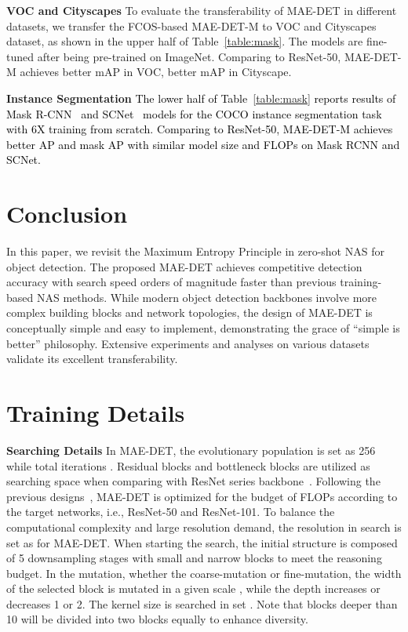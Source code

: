\documentclass[nohyperref]{article}
\theoremstyle{plain}
\theoremstyle{definition}
\theoremstyle{remark}
\begin{document}
\noindent\textbf{VOC and Cityscapes} 
To evaluate the transferability of MAE-DET in different datasets, we transfer the FCOS-based MAE-DET-M to VOC and Cityscapes dataset, as shown in the upper half of Table~\ref{table:mask}. The models are fine-tuned after being pre-trained on ImageNet. Comparing to ResNet-50, MAE-DET-M achieves  better mAP in VOC,  better mAP in Cityscape.

\noindent\textbf{Instance Segmentation} 
\textcolor{black}{The lower half of Table~\ref{table:mask} reports results of Mask R-CNN~\citep{maskrcnn} and SCNet~\citep{scnet} models for the COCO instance segmentation task with 6X training from scratch. Comparing to ResNet-50, MAE-DET-M achieves better AP and mask AP with similar model size and FLOPs on Mask RCNN and SCNet.}


\section{Conclusion}
In this paper, we revisit the Maximum Entropy Principle in zero-shot NAS for object detection. The proposed MAE-DET achieves competitive detection accuracy with search speed orders of magnitude faster than previous training-based NAS methods. While modern object detection backbones involve more complex building blocks and network topologies, the design of MAE-DET is conceptually simple and easy to implement, demonstrating the grace of ``simple is better'' philosophy. Extensive experiments and analyses on various datasets validate its excellent transferability. 












\newpage
\appendix
\onecolumn


\section{Training Details}\label{app:detail}
\noindent\textbf{Searching Details} 
In MAE-DET, the evolutionary population  is set as 256 while total iterations . 
Residual blocks and bottleneck blocks are utilized as searching space when comparing with ResNet series backbone~\citep{resnet}.
Following the previous designs~\citep{detnas,spnas,spinenet}, MAE-DET is optimized for the budget of FLOPs according to the target networks, i.e., ResNet-50 and ResNet-101.
To balance the computational complexity and large resolution demand, the resolution in search is set as  for MAE-DET.
When starting the search, the initial structure is composed of 5 downsampling stages with small and narrow blocks to meet the reasoning budget. 
In the mutation, whether the coarse-mutation or fine-mutation, the width of the selected block is mutated in a given scale , while the depth increases or decreases 1 or 2. The kernel size is searched in set . Note that blocks deeper than 10 will be divided into two blocks equally to enhance diversity.
\end{document}
